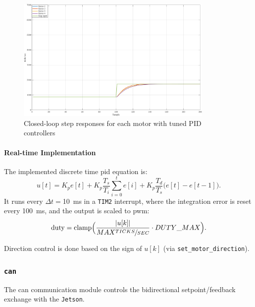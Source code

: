 \begin{figure}[H]
  \centering
  \includegraphics[width=0.85\textwidth]{imgs/closed res.png}
  \caption{Closed-loop step responses for each motor with tuned PID controllers}
  \label{fig:step_responses}
\end{figure}

\paragraph*{Real-time Implementation}
The implemented discrete time \gls{pid} equation is:
\begin{equation}
  u[t] = K_p e[t] + K_p \frac{T_s}{T_i} \sum_{i=0}^{t} e[i] + K_p \frac{T_d}{T_s}\bigl(e[t] - e[t-1]\bigr).
\end{equation}
It runs every $\Delta t = $\SI{10}{\milli\second} in a \texttt{TIM2} interrupt, where the integration error is reset every \SI{100}{\milli\second}, and the output is scaled to \gls{pwm}:
\begin{equation}
  \mathrm{duty} = \mathrm{clamp}\Bigl(\frac{|u[k]|}{MAX\sfrac{TICKS}{SEC}} \cdot DUTY\_MAX\Bigr).
\end{equation}

Direction control is done based on the sign of $u[k]$ (via \texttt{set\_motor\_direction}).

\subsubsection*{\texttt{can}}\label{sec:can}

The \gls{can} communication module controls the bidirectional setpoint/feedback exchange with the \texttt{Jetson}.

